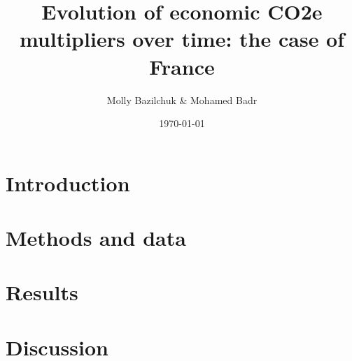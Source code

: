 \documentclass[a4paper,twoside]{article}
\title{Evolution of economic CO2e multipliers over time: the case of France}
\author{Molly Bazilchuk & Mohamed Badr}
\date{\today}
\begin{document}
\maketitle
\vspace{3cm}

\section{Introduction}

\section{Methods and data}

\section{Results}

\section{Discussion}
\end{document}
